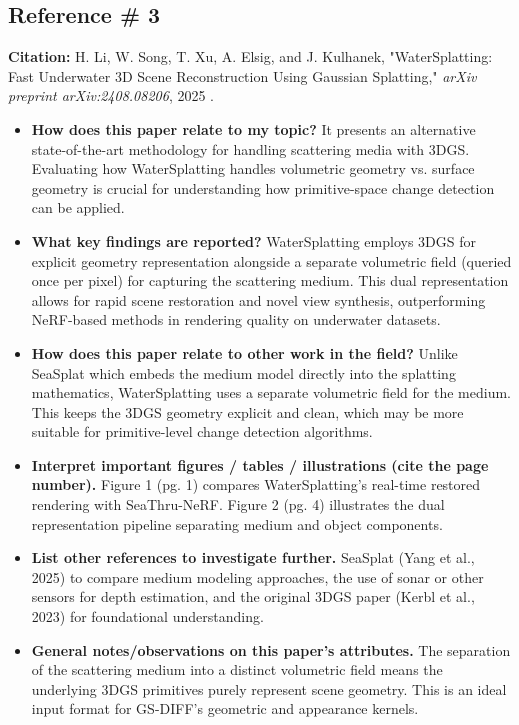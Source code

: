 \documentclass[12pt, a4paper]{article}
\begin{document}
\subsection*{Reference \# 3 }
\textbf{Citation:} H. Li, W. Song, T. Xu, A. Elsig, and J. Kulhanek, "WaterSplatting: Fast Underwater 3D Scene Reconstruction Using Gaussian Splatting," \textit{arXiv preprint arXiv:2408.08206}, 2025 \cite{li2025watersplattingfastunderwater3d}.
\begin{itemize}
    \item \textbf{How does this paper relate to my topic?} It presents an alternative state-of-the-art methodology for handling scattering media with 3DGS. Evaluating how WaterSplatting handles volumetric geometry vs. surface geometry is crucial for understanding how primitive-space change detection can be applied.
    \item \textbf{What key findings are reported?} WaterSplatting employs 3DGS for explicit geometry representation alongside a separate volumetric field (queried once per pixel) for capturing the scattering medium. This dual representation allows for rapid scene restoration and novel view synthesis, outperforming NeRF-based methods in rendering quality on underwater datasets.
    \item \textbf{How does this paper relate to other work in the field?} Unlike SeaSplat which embeds the medium model directly into the splatting mathematics, WaterSplatting uses a separate volumetric field for the medium. This keeps the 3DGS geometry explicit and clean, which may be more suitable for primitive-level change detection algorithms.
    \item \textbf{Interpret important figures / tables / illustrations (cite the page number).} Figure 1 (pg. 1) compares WaterSplatting's real-time restored rendering with SeaThru-NeRF. Figure 2 (pg. 4) illustrates the dual representation pipeline separating medium and object components.
    \item \textbf{List other references to investigate further.} SeaSplat (Yang et al., 2025) to compare medium modeling approaches, the use of sonar or other sensors for depth estimation, and the original 3DGS paper (Kerbl et al., 2023) for foundational understanding.
    \item \textbf{General notes/observations on this paper’s attributes.} The separation of the scattering medium into a distinct volumetric field means the underlying 3DGS primitives purely represent scene geometry. This is an ideal input format for GS-DIFF's geometric and appearance kernels.
\end{itemize}
\end{document}
